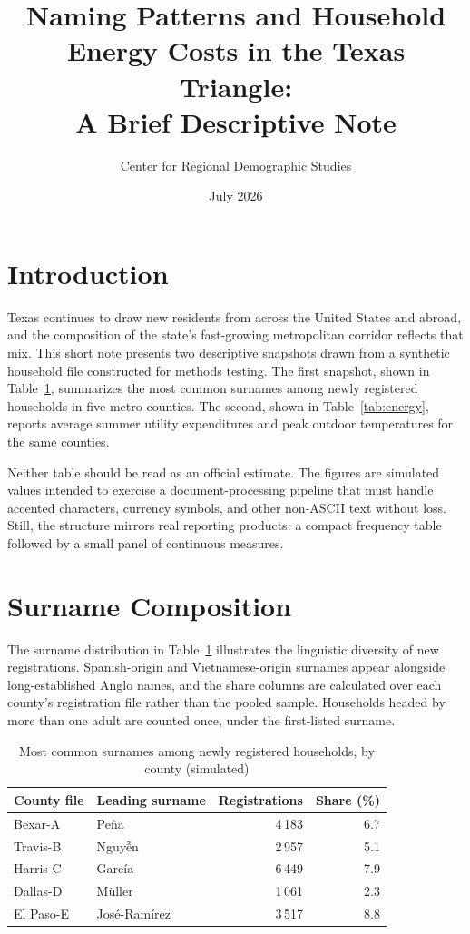 \documentclass[11pt]{article}
\title{Naming Patterns and Household Energy Costs in the Texas Triangle:\\A Brief Descriptive Note}
\author{Center for Regional Demographic Studies}
\date{July 2026}
\begin{document}
\maketitle

\section{Introduction}

Texas continues to draw new residents from across the United States and abroad, and the composition of the state's fast-growing metropolitan corridor reflects that mix. This short note presents two descriptive snapshots drawn from a synthetic household file constructed for methods testing. The first snapshot, shown in Table~\ref{tab:names}, summarizes the most common surnames among newly registered households in five metro counties. The second, shown in Table~\ref{tab:energy}, reports average summer utility expenditures and peak outdoor temperatures for the same counties.

Neither table should be read as an official estimate. The figures are simulated values intended to exercise a document-processing pipeline that must handle accented characters, currency symbols, and other non-ASCII text without loss. Still, the structure mirrors real reporting products: a compact frequency table followed by a small panel of continuous measures.

\section{Surname Composition}

The surname distribution in Table~\ref{tab:names} illustrates the linguistic diversity of new registrations. Spanish-origin and Vietnamese-origin surnames appear alongside long-established Anglo names, and the share columns are calculated over each county's registration file rather than the pooled sample. Households headed by more than one adult are counted once, under the first-listed surname.

\begin{table}[ht]
\centering
\caption{Most common surnames among newly registered households, by county (simulated)}
\label{tab:names}
\begin{tabular}{llrr}
\toprule
County file & Leading surname & Registrations & Share (\%) \\
\midrule
Bexar-A & Peña & 4\,183 & 6.7 \\
Travis-B & Nguyễn & 2\,957 & 5.1 \\
Harris-C & García & 6\,449 & 7.9 \\
Dallas-D & Müller & 1\,061 & 2.3 \\
El Paso-E & José-Ramírez & 3\,517 & 8.8 \\
\bottomrule
\end{tabular}
\end{table}
\end{document}
